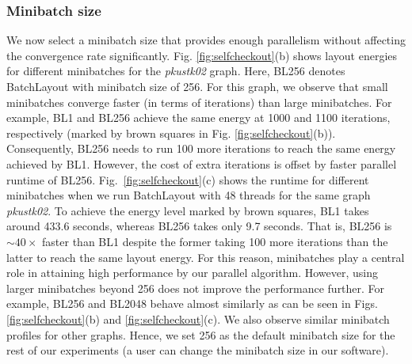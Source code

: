 \documentclass{vgtc}
\newcommand*{\myfont}{\fontfamily{lmtt}\selectfont}
\newcommand{\toolname}{{BatchLayout}}
\begin{document}

\subsubsection{Minibatch size}
We now select a minibatch size that provides enough parallelism without affecting the convergence rate significantly.
Fig. \ref{fig:selfcheckout}(b) shows layout energies for different minibatches for the \emph{pkustk02} graph.
Here, BL256 denotes \toolname{} with minibatch size of 256.
For this graph, we observe that small minibatches converge faster (in terms of iterations) than large minibatches. 
For example, BL1 and BL256 achieve the same energy at 1000 and 1100 iterations, respectively (marked by brown squares in Fig. \ref{fig:selfcheckout}(b)). 
Consequently, BL256 needs to run 100 more iterations to reach the same energy achieved by BL1.
However, the cost of extra iterations is offset by faster parallel runtime of BL256.
Fig.~\ref{fig:selfcheckout}(c) shows the runtime for different minibatches when we run \toolname{} with 48 threads for the same graph \emph{pkustk02}.
To achieve the energy level marked by brown squares, BL1 takes around 433.6 seconds, whereas BL256 takes only 9.7 seconds.
That is, BL256 is $\sim 40\times$ faster than BL1 despite the former taking 100 more iterations than the latter to reach the same layout energy.
For this reason, minibatches play a central role in attaining high performance by our parallel algorithm.
However, using larger minibatches beyond 256 does not improve the performance further.
For example, BL256 and BL2048 behave almost similarly as can be seen in Figs. \ref{fig:selfcheckout}(b) and \ref{fig:selfcheckout}(c).
We also observe similar minibatch profiles for other graphs. Hence, we set 256 as the default minibatch size for the rest of our experiments (a user can change the minibatch size in our software). 
\end{document}

